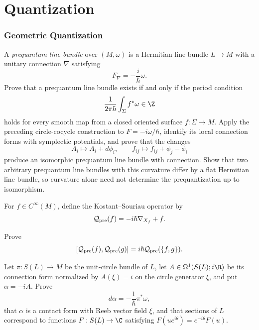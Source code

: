 \part{Quantization}

\section{Geometric Quantization}

\begin{exercise}
A \emph{prequantum line bundle} over $(M,\omega)$ is a Hermitian line bundle
$L\to M$ with a unitary connection $\nabla$ satisfying
\[
F_\nabla=-\frac{i}{\hbar}\omega.
\]
Prove that a prequantum line bundle exists if and only if the period
condition
\[
\frac1{2\pi\hbar}\int_\Sigma f^*\omega\in\Z
\]
holds for every smooth map from a closed oriented surface
$f:\Sigma\to M$.  Apply the preceding circle-cocycle construction to
$F=-i\omega/\hbar$, identify its local connection forms with symplectic
potentials, and prove that the changes
\[
A_i\longmapsto A_i+d\phi_i,
\qquad
f_{ij}\longmapsto f_{ij}+\phi_j-\phi_i
\]
produce an isomorphic prequantum line bundle with connection.  Show that
two arbitrary prequantum line bundles with this curvature differ by a flat
Hermitian line bundle, so curvature alone need not determine the
prequantization up to isomorphism.
\end{exercise}

\begin{exercise}
For $f\in C^\infty(M)$, define the Kostant--Souriau operator by
\[
\mathcal Q_{\rm pre}(f)=-i\hbar\nabla_{X_f}+f.
\]

Prove
\[
[\mathcal Q_{\rm pre}(f),\mathcal Q_{\rm pre}(g)]
=i\hbar\mathcal Q_{\rm pre}(\{f,g\}).
\]
\end{exercise}

\begin{exercise}[Contactification]
Let $\pi:S(L)\to M$ be the unit-circle bundle of $L$, let
$A\in\Omega^1(S(L);i\R)$ be its connection form normalized by
$A(\xi)=i$ on the circle generator $\xi$, and put $\alpha=-iA$.
Prove
\[
d\alpha=-\frac1\hbar\pi^*\omega,
\]
that $\alpha$ is a contact form with Reeb vector field $\xi$, and that
sections of $L$ correspond to functions $F:S(L)\to\C$ satisfying
$F(ue^{i\theta})=e^{-i\theta}F(u)$.
\end{exercise}

